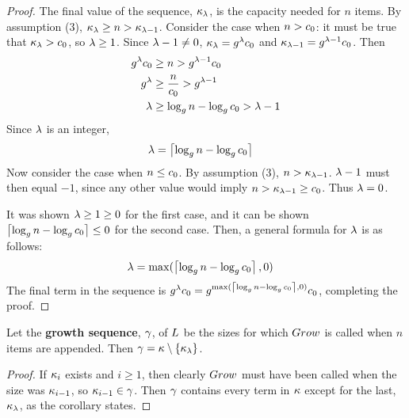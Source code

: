 \begin{proof}
	The final value of the sequence, $\kappa_\lambda$, is the capacity needed for $n$ items. By assumption (3), $\kappa_\lambda \geq n > \kappa_{\lambda - 1}$. Consider the case when $n > c_0$: it must be true that $\kappa_\lambda > c_0$, so $\lambda \geq 1$. Since $\lambda - 1 \neq 0$, $\kappa_\lambda = g^\lambda c_0$ and $\kappa_{\lambda - 1} = g^{\lambda - 1}c_0$. Then
	\begin{align*}
	g^\lambda c_0 &\geq n > g^{\lambda - 1}c_0\\
	g^\lambda &\geq \frac{n}{c_0} > g^{\lambda - 1}\\
	\lambda &\geq \log_{g} n - \log_{g} c_0 > \lambda - 1\\
	\end{align*}
	Since $\lambda$ is an integer,
	\begin{align*}
	\lambda &= \left\lceil \log_{g} n - \log_{g} c_0 \right\rceil
	\end{align*}
	Now consider the case when $n \leq c_0$. By assumption (3), $n > \kappa_{\lambda - 1}$. $\lambda - 1$ must then equal $-1$, since any other value would imply $n > \kappa_{\lambda - 1} \geq c_0$. Thus $\lambda = 0$.
	
	It was shown $\lambda \geq 1 \geq 0$ for the first case, and it can be shown $\left\lceil \log_{g} n - \log_{g} c_0 \right\rceil \leq 0$ for the second case. Then, a general formula for $\lambda$ is as follows:
	\begin{align*}
	\lambda &= \max(\left\lceil \log_{g} n - \log_{g} c_0 \right\rceil, 0)
	\end{align*}
	The final term in the sequence is $g^\lambda c_0 = g^{\max(\left\lceil \log_{g} n - \log_{g} c_0 \right\rceil, 0)}c_0$, completing the proof.
\end{proof}

\begin{corollary}
\label{coro:GrowthSeq}
	Let the \textbf{growth sequence}, $\gamma$, of $L$ be the sizes for which $Grow$ is called when $n$ items are appended. Then $\gamma = \kappa \setminus \left\{ \kappa_\lambda \right\}$.
\end{corollary}

\begin{proof}
	If $\kappa_i$ exists and $i \geq 1$, then clearly $Grow$ must have been called when the size was $\kappa_{i - 1}$, so $\kappa_{i - 1} \in \gamma$. Then $\gamma$ contains every term in $\kappa$ except for the last, $\kappa_\lambda$, as the corollary states.
\end{proof}

